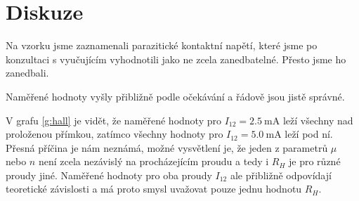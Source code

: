 \section*{Diskuze}
Na vzorku jsme zaznamenali parazitické kontaktní napětí, které jsme po konzultaci s vyučujícím vyhodnotili jako ne zcela zanedbatelné. Přesto jsme ho zanedbali.

Naměřené hodnoty vyšly přibližně podle očekávání a řádově jsou jistě správné.

V grafu \ref{g:hall} je vidět, že naměřené hodnoty pro $I_{12}=\SI{2.5}{\milli\ampere}$ leží všechny nad proloženou přímkou, zatímco všechny hodnoty pro $I_{12}=\SI{5.0}{\milli\ampere}$ leží pod ní.
Přesná příčina je nám neznámá, možné vysvětlení je, že jeden z parametrů $\mu$ nebo $n$ není zcela nezávislý na procházejícím proudu a tedy i $R_H$ je pro různé proudy jiné.
Naměřené hodnoty pro oba proudy $I_{12}$ ale přibližně odpovídají teoretické závislosti a má proto smysl uvažovat pouze jednu hodnotu $R_H$.